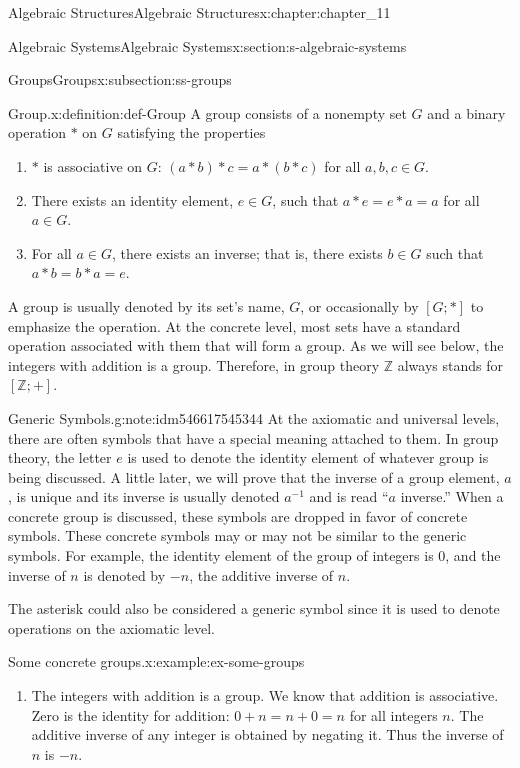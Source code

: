 \documentclass[oneside,10pt,]{book}
\numberwithin{equation}{section}
\begin{document}
\begin{chapterptx}{Algebraic Structures}{}{Algebraic Structures}{}{}{x:chapter:chapter_11}
\begin{sectionptx}{Algebraic Systems}{}{Algebraic Systems}{}{}{x:section:s-algebraic-systems}
\begin{subsectionptx}{Groups}{}{Groups}{}{}{x:subsection:ss-groups}
\begin{definition}{Group.}{x:definition:def-Group}%
%
\label{g:notation:idm546617800048}%
A group consists of a nonempty set \(G\) and a binary operation \(*\) on \(G\) satisfying the properties%
\begin{enumerate}[label=(\alph*)]
\item{}\(*\) is associative on \(G\):     \((a*b)*c=a*(b*c)\)   for all \(a, b, c \in G\).%
\item{}There exists an identity element, \(e \in G\), such that \(a*e=e*a=a\)  for all \(a \in  G\).%
\item{}For all \(a \in  G\), there exists an inverse; that is, there exists \(b\in G\) such that \(a *b = b*a=e\).%
\end{enumerate}
%
\end{definition}
A group is usually denoted by its set's name, \(G\), or occasionally by \([G; * ]\) to emphasize the operation. At the concrete level, most sets have a standard operation associated with them that will form a group. As we will see below, the integers with addition is a group. Therefore, in group theory \(\mathbb{Z}\) always stands for \([\mathbb{Z}; +]\).%
\begin{note}{Generic Symbols.}{g:note:idm546617545344}%
At the axiomatic and universal levels, there are often symbols that have a special meaning attached to them. In group theory, the letter \(e\) is used to denote the identity element of whatever group is being discussed. A little later, we will prove that the inverse of a group element, \(a\), is unique and its inverse is usually denoted \(a^{-1}\) and is read ``\(a\) inverse.'' When a concrete group is discussed, these symbols are dropped in favor of concrete symbols. These concrete symbols may or may not be similar to the generic symbols. For example, the identity element of the group of integers is 0, and the inverse of \(n\) is denoted by \(-n\), the additive inverse of \(n\).%
\par
The asterisk could also be considered a generic symbol since it is used to denote operations on the axiomatic level.%
\end{note}
\begin{example}{Some concrete groups.}{x:example:ex-some-groups}%
%
\begin{enumerate}[label=(\alph*)]
\item{}The integers with addition is a group. We know that addition is associative.  Zero is the identity for addition: \(0 + n = n + 0 = n\) for all integers \(n\). The additive inverse of any integer is obtained by negating it.  Thus the inverse of \(n\) is \(-n\).%

\end{enumerate}
\end{example}
\end{subsectionptx}
\end{sectionptx}
\end{chapterptx}
\end{document}

